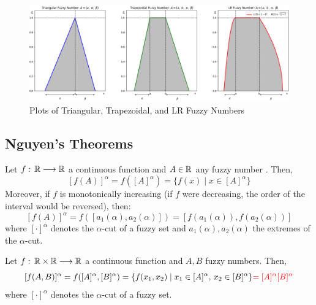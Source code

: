 \begin{figure}[H]
    \centering
    \includegraphics[width=\textwidth]{ch1/figures/fuzzy_numbers.png}
    \caption{Plots of Triangular, Trapezoidal, and LR Fuzzy Numbers}
    \label{fig:fuzzy_numbers}
\end{figure}



\subsection{Nguyen's Theorems}

\begin{theorem}
    Let $f:\, \mathbb{R} \longrightarrow \mathbb{R}$ a continuous function and $A\in \mathbb{R}$ any fuzzy number . Then,
    \[
    [f(A)]^{\alpha} = f([A]^{\alpha})=\{f(x)\mid x\in [A]^\alpha\}
    \]
    Moreover, if $f$ is monotonically increasing (if $f$ were decreasing, the order of the interval would be reversed), then:
    \[
    [f(A)]^{\alpha} = f([a_1(\alpha), a_2(\alpha)])=
    [f(a_1(\alpha)), f(a_2(\alpha))]
    \]
    where $[\cdot]^\alpha$ denotes the $\alpha$-cut of a fuzzy set and $a_1(\alpha), a_2(\alpha)$ the extremes of the $\alpha$-cut.
\end{theorem}


\begin{theorem}
    Let $f:\, \mathbb{R} \times \mathbb{R}\longrightarrow \mathbb{R}$ a continuous function and $A,B$  fuzzy numbers. Then,
    \[
    [f(A,B)]^{\alpha} = f([A]^{\alpha},[B]^{\alpha})=\{f(x_1,x_2)\mid x_1\in [A]^\alpha, \, x_2\in [B]^\alpha\}
    {\color{red}=[A]^\alpha [B]^\alpha}
    \]
    where $[\cdot]^\alpha$ denotes the $\alpha$-cut of a fuzzy set.
\end{theorem}


